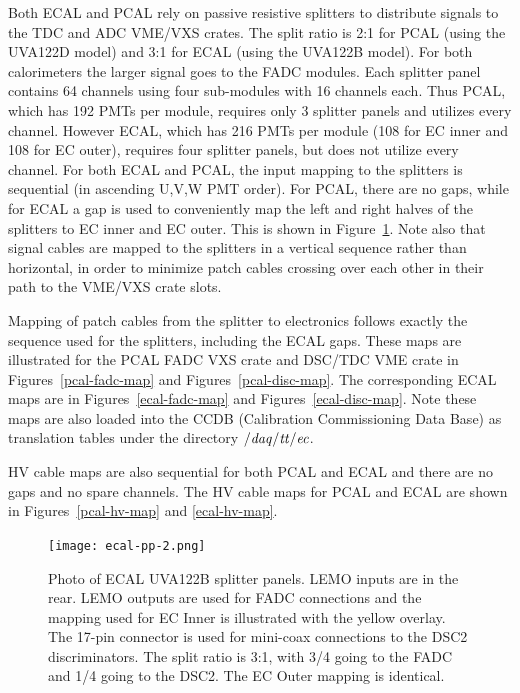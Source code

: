 \documentclass[letterpaper,10pt]{article}
\begin{document}
Both ECAL and PCAL rely on passive resistive splitters to distribute signals to the TDC and ADC
VME/VXS crates.  The split ratio is 2:1 for PCAL (using the UVA122D model)  and 3:1 for ECAL
(using the UVA122B model).  For both calorimeters the larger signal goes to the FADC modules.
Each splitter panel contains 64 channels using four sub-modules with 16 channels each.  Thus PCAL,
which has 192 PMTs per module, requires only 3 splitter panels and utilizes every channel. However ECAL,
which has 216 PMTs per module (108 for EC inner and 108 for EC outer), requires four splitter panels,
but does not utilize every channel.  For both ECAL and PCAL, the input mapping to the splitters
is sequential (in ascending U,V,W PMT order).  For PCAL, there are no gaps, while for ECAL a gap
is used to conveniently map the left and right halves of the splitters to EC inner and EC outer.  This
is shown in Figure~\ref{ecal-pp-2}.  Note also that signal cables are mapped to the splitters in a
vertical sequence rather than horizontal, in order to minimize patch cables crossing over each other
in their path to the VME/VXS crate slots.

Mapping of patch cables from the splitter to electronics follows exactly the sequence used for the
splitters, including the ECAL gaps.  These maps are illustrated for the PCAL FADC VXS crate and DSC/TDC VME crate in
Figures~\ref{pcal-fadc-map} and Figures~\ref{pcal-disc-map}.  The corresponding ECAL maps are in
Figures~\ref{ecal-fadc-map} and Figures~\ref{ecal-disc-map}.  Note these maps are also loaded into
the CCDB (Calibration Commissioning Data Base) as translation tables  under the directory $\it{/daq/tt/ec}$.

HV cable maps are also sequential for both PCAL and ECAL and there are no gaps and no spare channels.
The HV cable maps for PCAL and ECAL are shown in Figures~\ref{pcal-hv-map} and \ref{ecal-hv-map}.

\begin{figure}[htbp]
\vspace{2mm}
  \centering
  \texttt{[image: ecal-pp-2.png]}
\caption{Photo of ECAL UVA122B splitter panels.  LEMO inputs are in the rear.  LEMO outputs are used
  for FADC connections and the mapping used for EC Inner is illustrated with the yellow overlay.  The 17-pin connector
  is used for mini-coax connections to the DSC2 discriminators.  The split ratio is 3:1, with 3/4 going
  to the FADC and 1/4 going to the DSC2.  The EC Outer mapping is identical.}
\label{ecal-pp-2}
\end{figure}
\end{document}
